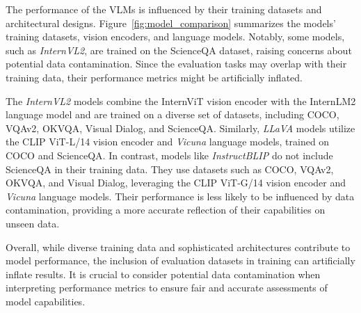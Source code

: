 The performance of the VLMs is influenced by their training datasets and architectural designs. Figure~\ref{fig:model_comparison} summarizes the models' training datasets, vision encoders, and language models. Notably, some models, such as \emph{InternVL2}, are trained on the ScienceQA dataset, raising concerns about potential data contamination. Since the evaluation tasks may overlap with their training data, their performance metrics might be artificially inflated.

The \emph{InternVL2} models combine the InternViT vision encoder with the InternLM2 language model and are trained on a diverse set of datasets, including COCO, VQAv2, OKVQA, Visual Dialog, and ScienceQA. Similarly, \emph{LLaVA} models utilize the CLIP ViT-L/14 vision encoder and \emph{Vicuna} language models, trained on COCO and ScienceQA. In contrast, models like \emph{InstructBLIP} do not include ScienceQA in their training data. They use datasets such as COCO, VQAv2, OKVQA, and Visual Dialog, leveraging the CLIP ViT-G/14 vision encoder and \emph{Vicuna} language models. Their performance is less likely to be influenced by data contamination, providing a more accurate reflection of their capabilities on unseen data.

Overall, while diverse training data and sophisticated architectures contribute to model performance, the inclusion of evaluation datasets in training can artificially inflate results. It is crucial to consider potential data contamination when interpreting performance metrics to ensure fair and accurate assessments of model capabilities.